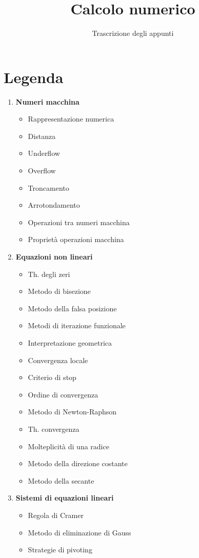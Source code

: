 \documentclass[11pt,a4paper]{article}
\begin{document}
\title{Calcolo numerico}\author{Trascrizione degli appunti}\date{}\maketitle
\section*{Legenda}
\begin{enumerate}
\item \textbf{Numeri macchina}
\begin{itemize}
\item Rappresentazione numerica
\item Distanza
\item Underflow
\item Overflow
\item Troncamento
\item Arrotondamento
\item Operazioni tra numeri macchina
\item Proprietà operazioni macchina
\end{itemize}
\item \textbf{Equazioni non lineari}
\begin{itemize}
\item Th. degli zeri
\item Metodo di bisezione
\item Metodo della falsa posizione
\item Metodi di iterazione funzionale
\item Interpretazione geometrica
\item Convergenza locale
\item Criterio di stop
\item Ordine di convergenza
\item Metodo di Newton-Raphson
\item Th. convergenza
\item Molteplicità di una radice
\item Metodo della direzione costante
\item Metodo della secante
\end{itemize}
\item \textbf{Sistemi di equazioni lineari}
\begin{itemize}
\item Regola di Cramer
\item Metodo di eliminazione di Gauss
\item Strategie di pivoting

\end{itemize}
\end{enumerate}
\end{document}
